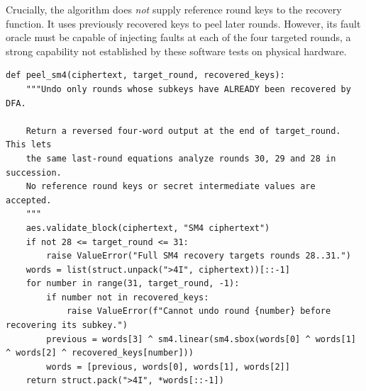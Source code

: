\documentclass[11pt,a4paper]{report}
\begin{document}
Crucially, the algorithm does \emph{not} supply reference round keys to the recovery function. It uses previously recovered keys to peel later rounds. However, its fault oracle must be capable of injecting faults at each of the four targeted rounds, a strong capability not established by these software tests on physical hardware.
\begin{lstlisting}[style=pycode,caption={Undoing already recovered SM4 rounds, from piret.py}]
def peel_sm4(ciphertext, target_round, recovered_keys):
    """Undo only rounds whose subkeys have ALREADY been recovered by DFA.

    Return a reversed four-word output at the end of target_round. This lets
    the same last-round equations analyze rounds 30, 29 and 28 in succession.
    No reference round keys or secret intermediate values are accepted.
    """
    aes.validate_block(ciphertext, "SM4 ciphertext")
    if not 28 <= target_round <= 31:
        raise ValueError("Full SM4 recovery targets rounds 28..31.")
    words = list(struct.unpack(">4I", ciphertext))[::-1]
    for number in range(31, target_round, -1):
        if number not in recovered_keys:
            raise ValueError(f"Cannot undo round {number} before recovering its subkey.")
        previous = words[3] ^ sm4.linear(sm4.sbox(words[0] ^ words[1] ^ words[2] ^ recovered_keys[number]))
        words = [previous, words[0], words[1], words[2]]
    return struct.pack(">4I", *words[::-1])
\end{lstlisting}
\end{document}
